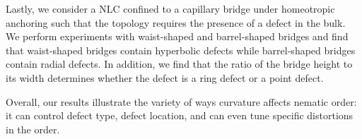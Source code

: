 \documentclass[11pt]{article}   %
\begin{document}
Lastly, we consider a NLC confined to a capillary bridge under homeotropic anchoring such that the topology requires the presence of a defect in the bulk.
We perform experiments with waist-shaped and barrel-shaped bridges and find that waist-shaped bridges contain hyperbolic defects while barrel-shaped bridges contain radial defects.
In addition, we find that the ratio of the bridge height to its width determines whether the defect is a ring defect or a point defect.

Overall, our results illustrate the variety of ways curvature affects nematic order: it can control defect type, defect location, and can even tune specific distortions in the order.
\end{document}

